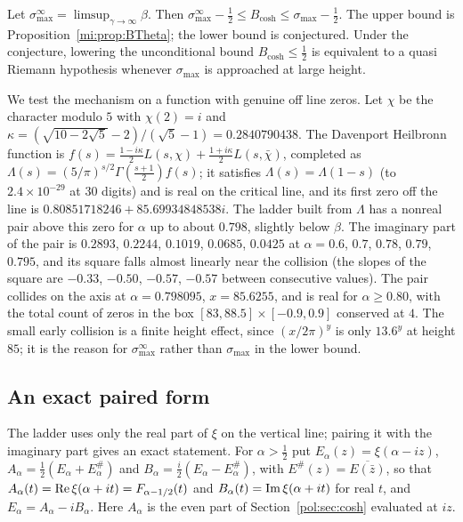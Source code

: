 \begin{conjecture}\label{mi:conj:quasi}
Let $\sigma_{\max}^\infty=\limsup_{\gamma\to\infty}\beta$. Then $\sigma_{\max}^\infty-\frac12\le B_{\cosh}\le\sigma_{\max}-\frac12$. The upper bound is Proposition~\ref{mi:prop:BTheta}; the lower bound is conjectured. Under the conjecture, lowering the unconditional bound $B_{\cosh}\le\frac12$ is equivalent to a quasi Riemann hypothesis whenever $\sigma_{\max}$ is approached at large height.
\end{conjecture}

We test the mechanism on a function with genuine off line zeros. Let $\chi$ be the character modulo $5$ with $\chi(2)=i$ and $\kappa=(\sqrt{10-2\sqrt5}-2)/(\sqrt5-1)=0.2840790438$. The Davenport Heilbronn function \cite{DH36} is $f(s)=\frac{1-i\kappa}2L(s,\chi)+\frac{1+i\kappa}2L(s,\bar\chi)$, completed as $\Lambda(s)=(5/\pi)^{s/2}\Gamma(\frac{s+1}2)f(s)$; it satisfies $\Lambda(s)=\Lambda(1-s)$ (to $2.4\times10^{-29}$ at $30$ digits) and is real on the critical line, and its first zero off the line is $0.80851718246+85.69934848538i$. The ladder built from $\Lambda$ has a nonreal pair above this zero for $\alpha$ up to about $0.798$, slightly below $\beta$. The imaginary part of the pair is $0.2893$, $0.2244$, $0.1019$, $0.0685$, $0.0425$ at $\alpha=0.6$, $0.7$, $0.78$, $0.79$, $0.795$, and its square falls almost linearly near the collision (the slopes of the square are $-0.33$, $-0.50$, $-0.57$, $-0.57$ between consecutive values). The pair collides on the axis at $\alpha=0.798095$, $x=85.6255$, and is real for $\alpha\ge0.80$, with the total count of zeros in the box $[83,88.5]\times[-0.9,0.9]$ conserved at $4$. The small early collision is a finite height effect, since $(x/2\pi)^y$ is only $13.6^y$ at height $85$; it is the reason for $\sigma_{\max}^\infty$ rather than $\sigma_{\max}$ in the lower bound.

\subsection{An exact paired form}\label{mi:sec:paired}

The ladder uses only the real part of $\xi$ on the vertical line; pairing it with the imaginary part gives an exact statement. For $\alpha>\frac12$ put $E_\alpha(z)=\xi(\alpha-iz)$, $A_\alpha=\frac12(E_\alpha+E_\alpha^\#)$ and $B_\alpha=\frac i2(E_\alpha-E_\alpha^\#)$, with $E^\#(z)=\overline{E(\bar z)}$, so that $A_\alpha(t)=\operatorname{Re}\xi(\alpha+it)=F_{\alpha-1/2}(t)$ and $B_\alpha(t)=\operatorname{Im}\xi(\alpha+it)$ for real $t$, and $E_\alpha=A_\alpha-iB_\alpha$. Here $A_\alpha$ is the even part of Section~\ref{pol:sec:cosh} evaluated at $iz$.

